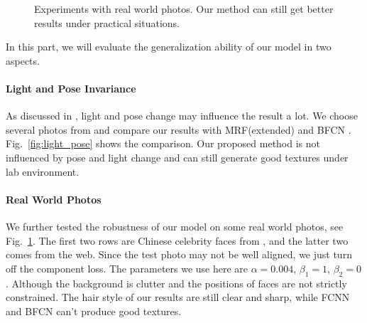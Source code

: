\documentclass[10pt,twocolumn,letterpaper]{article}
\begin{document}
\begin{figure}[htbp]
{\begin{minipage}[b]{0.22\linewidth}
\end{minipage}
}
\caption{Experiments with real world photos. Our method can still get better results under practical situations.}
\label{fig:real_world}
\end{figure}

In this part, we will evaluate the generalization ability of our model in two aspects. 

\paragraph{Light and Pose Invariance} As discussed in \cite{zhang2010lighting}, light and pose change may influence the result a lot. We choose several photos from \cite{zhang2010lighting} and compare our results with MRF(extended) \cite{zhang2010lighting} and BFCN \cite{zhang2017content}. Fig.~\ref{fig:light_pose} shows the comparison. Our proposed method is not influenced by pose and light change and can still generate good textures under lab environment. 

\paragraph{Real World Photos} We further tested the robustness of our model on some real world photos, see Fig.~\ref{fig:real_world}. The first two rows are Chinese celebrity faces from \cite{zhang2010lighting}, and the latter two comes from the web. Since the test photo may not be well aligned, we just turn off the component loss. The parameters we use here are $\alpha=0.004$, $\beta_1=1$, $\beta_2=0$. Although the background is clutter and the positions of faces are not strictly constrained. The hair style of our results are still clear and sharp, while FCNN and BFCN can't produce good textures. 
\end{document}
